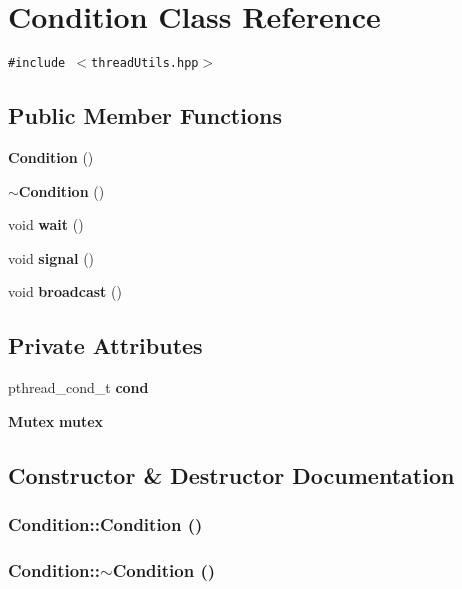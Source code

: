 \section{Condition Class Reference}
\label{classCondition}
{\tt \#include $<$thread\-Utils.hpp$>$}

\subsection*{Public Member Functions}
\begin{CompactItemize}
\item 
{\bf Condition} ()
\item 
{\bf $\sim$Condition} ()
\item 
void {\bf wait} ()
\item 
void {\bf signal} ()
\item 
void {\bf broadcast} ()
\end{CompactItemize}
\subsection*{Private Attributes}
\begin{CompactItemize}
\item 
pthread\_\-cond\_\-t {\bf cond}
\item 
{\bf Mutex} {\bf mutex}
\end{CompactItemize}


\subsection{Constructor \& Destructor Documentation}
\subsubsection{\setlength{\rightskip}{0pt plus 5cm}Condition::Condition ()\hspace{0.3cm}{\tt  [inline]}}\label{classCondition_f11513db4fcbde93961fa0b65e7ab764}


\subsubsection{\setlength{\rightskip}{0pt plus 5cm}Condition::$\sim$Condition ()\hspace{0.3cm}{\tt  [inline]}}\label{classCondition_b42f6d2dfb2d0de4bed4ed5032d4a8fc}




